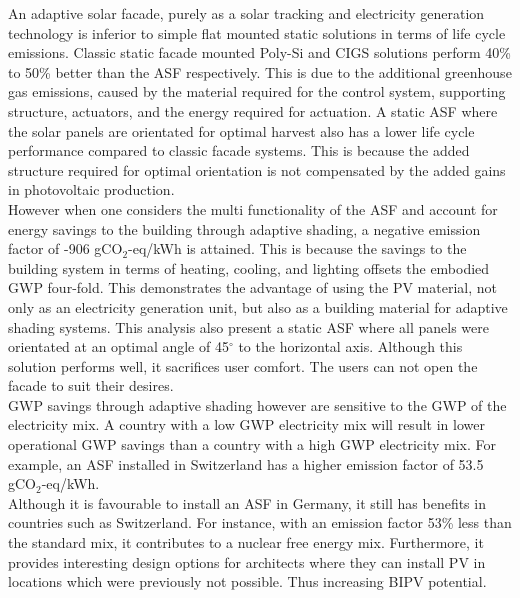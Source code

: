 
An adaptive solar facade, purely as a solar tracking and electricity generation technology is inferior to simple flat mounted static solutions in terms of life cycle emissions.  Classic static facade mounted Poly-Si and CIGS solutions perform 40\% to 50\% better than the ASF respectively. This is due to the additional greenhouse gas emissions, caused by the material required for the control system, supporting structure, actuators, and the energy required for actuation. A static ASF where the solar panels are orientated for optimal harvest also has a lower life cycle performance compared to classic facade systems. This is because the added structure required for optimal orientation is not compensated by the added gains in photovoltaic production.\\

However when one considers the multi functionality of the ASF and account for energy savings to the building through adaptive shading, a negative emission factor of  -906 gCO$_{2}$-eq/kWh is attained. This is because the savings to the building system in terms of heating, cooling, and lighting offsets the embodied GWP four-fold. This demonstrates the advantage of using the PV material, not only as an electricity generation unit, but also as a building material for adaptive shading systems. This analysis also present a static ASF where all panels were orientated at an optimal angle of 45$^{\circ}$ to the horizontal axis. Although this solution performs well, it sacrifices user comfort. The users can not open the facade to suit their desires.\\



GWP savings through adaptive shading however are sensitive to the GWP of the electricity mix. A country with a low GWP electricity mix will result in lower operational GWP savings than a country with a high GWP electricity mix. For example, an ASF installed in Switzerland has a higher emission factor of 53.5 gCO$_{2}$-eq/kWh.\\

Although it is favourable to install an ASF in Germany, it still has benefits in countries such as Switzerland. For instance, with an emission factor 53\% less than the standard mix, it contributes to a nuclear free energy mix. Furthermore, it provides interesting design options for architects where they can install PV in locations which were previously not possible. Thus increasing BIPV potential.\\


